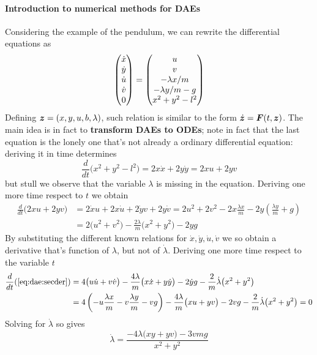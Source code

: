 	\paragraph{Introduction to numerical methods for DAEs} Considering the example of the pendulum, we can rewrite the differential equations as
	\[ \begin{pmatrix} \dot x \\ \dot y \\ \dot u \\ \dot v \\ 0  \end{pmatrix} = \begin{pmatrix} u \\ v \\ -\lambda x/m \\ -\lambda y / m - g \\x^2+y^2-l^2 \end{pmatrix} \]
	Defining $\boldsymbol{z} = (x,y,u,b,\lambda)$, such relation is similar to the form $\dot{\boldsymbol{z}} = \boldsymbol{F}(t,\boldsymbol{z})$. The main idea is in fact to \textbf{transform DAEs to ODEs}; note in fact that the last equation is the lonely one that's not already a ordinary differential equation: deriving it in time determines
	\[ \frac d{dt}\big(x^2 + y^2 - l^2\big) = 2 x\dot x + 2 y\dot y = 2x u + 2 yv  \]
	but stull we observe that the variable $\lambda$ is missing in the equation. Deriving one more time respect to $t$ we obtain
	\begin{equation} \label{eq:dae:secder} \begin{aligned}
		\frac{d}{dt}\big( 2x u + 2 yv \big) & = 2\dot x u + 2 x\dot u + 2\dot y v + 2 y \dot v = 2 u^2 + 2 v^2 - 2 x \frac{\lambda x}{m} - 2 y \left( \frac{\lambda y}m + g \right) \\
		& = 2\big( u^2 + v^2\big) - \frac{2\lambda}{m} \big(x^2 + y^2\big) - 2 y g
	\end{aligned} \end{equation}
	By substituting the different known relations for $\dot x,\dot y, \dot u, \dot v$ we so obtain a derivative that's function of $\lambda$, but not of $\dot \lambda$. Deriving one more time respect to the variable $t$
	\begin{align*}
		\frac{d}{dt}(\ref{eq:dae:secder}) & = 4\big(u\dot u + v\dot v\big) - \frac{4\lambda}{m} \big(x\dot x + y\dot y\big) - 2 \dot y g - \frac 2 m \dot \lambda \big(x^2 + y^2\big) \\
		& = 4 \left( - u \frac{\lambda  x}{m} - v \frac{\lambda y}{m} - vg \right) - \frac{4\lambda}{m} \big(xu + yv\big) - 2 vg - \frac 2 m \dot \lambda\big(x^2+y^2\big) = 0
	\end{align*}
	Solving for $\dot \lambda$ so gives
	\[ \dot \lambda = \frac{-4\lambda\big(xy+yv\big) -3 vmg }{x^2+y^2} \]
